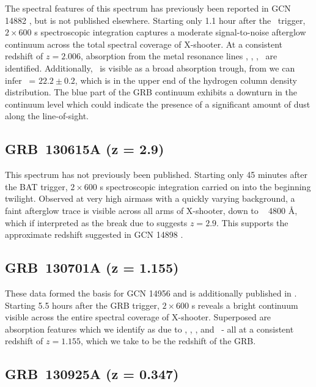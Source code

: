\documentclass{aa}    %
\begin{document}
The spectral features of this spectrum has previously been reported in GCN 14882
\citep{GCN14882}, but is not published elsewhere. Starting only 1.1 hour after
the \swift~trigger, $2\times600$ s spectroscopic integration captures a moderate
signal-to-noise afterglow continuum across the total spectral coverage of
X-shooter. At a consistent redshift of $z = 2.006$, absorption from the metal
resonance lines \feii, \mnii, \mgii, \mgi~are identified. Additionally, \lya~is
visible as a broad absorption trough, from we can infer \nh~= $22.2 \pm 0.2$,
which is in the upper end of the hydrogen column density distribution. The blue
part of the GRB continuum exhibits a downturn in the continuum level which could
indicate the presence of a significant amount of dust along the line-of-sight.

\subsection{GRB~130615A (z = 2.9)} \label{130615}

This spectrum has not previously been published. Starting only 45 minutes after
the BAT trigger, $2\times600$ s spectroscopic integration carried on into the
beginning twilight. Observed at very high airmass with a quickly varying
background, a faint afterglow trace is visible across all arms of X-shooter,
down to ~ 4800 \AA, which if interpreted as the break due to \lya suggests $z =
2.9$. This supports the approximate redshift suggested in GCN 14898
\citep{GCN14898}.


\subsection{GRB~130701A (z = 1.155)}\label{130701}

These data formed the basis for GCN 14956 \citep{GCN14956} and is additionally
published in \citet{Kruhler2015}. Starting 5.5 hours after the GRB trigger,
$2\times600$ s reveals a bright continuum visible across the entire spectral
coverage of X-shooter. Superposed are absorption features which we identify as
due to \feii, \mgii, \mgi, and \caii~- all at a consistent redshift of $z =
1.155$, which we take to be the redshift of the GRB.



\subsection{GRB~130925A (z = 0.347)}\label{130925}
\end{document}
